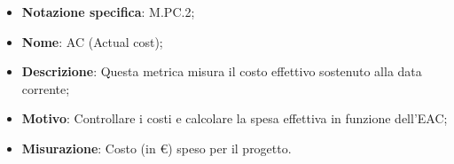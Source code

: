 \begin{itemize}
    \item \textbf{Notazione specifica}: M.PC.2;
    \item \textbf{Nome}: AC (Actual cost);
    \item \textbf{Descrizione}: Questa metrica misura il costo effettivo sostenuto alla data corrente;
    \item \textbf{Motivo}: Controllare i costi e calcolare la spesa effettiva in funzione dell'EAC;
    \item \textbf{Misurazione}: Costo (in €) speso per il progetto.
\end{itemize}
